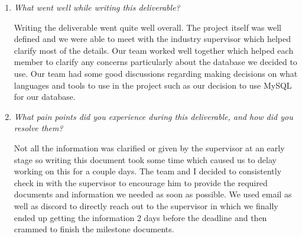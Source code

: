 \documentclass{article}
\begin{document}
\begin{enumerate}
    \item \textit{What went well while writing this deliverable?}
    
      Writing the deliverable went quite well overall. The project itself was well defined and we were able to meet with the industry supervisor which helped clarify most of the details. Our team worked well together which helped each member to clarify any concerns particularly about the database we decided to use. Our team had some good discussions regarding making decisions on  what languages and tools to use in the project such as our decision to use MySQL for our database.

    \item \textit{What pain points did you experience during this deliverable, and how did you resolve them?}
    
    Not all the information was clarified or given by the supervisor at an early stage so writing this document took some time which caused us to delay working on this for a couple days. The team and I decided to consistently check in with the supervisor to encourage him to provide the required documents and information we needed as soon as possible. We used email as well as discord to directly reach out to the supervisor in which we finally ended up getting the information 2 days before the deadline and then crammed to finish the milestone documents.
    
\end{enumerate}  
\end{document}
